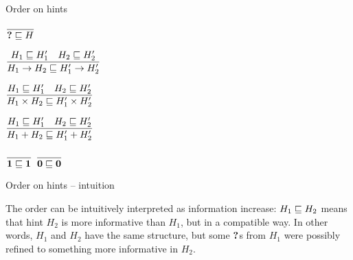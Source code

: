 \documentclass{beamer}
\newcommand{\Fun}[2]{#1 \to #2}
\newcommand{\Prod}[2]{#1 \times #2}
\newcommand{\Sum}[2]{#1 + #2}
\newcommand{\Unit}{\textbf{1}}
\newcommand{\Empty}{\textbf{0}}
\newcommand{\rulename}[1]{\textsc{\footnotesize{#1}}}
\newcommand{\infrule}[3][]{\displaystyle \frac{#2}{#3} \rulename{#1}}
\begin{document}
\begin{frame}{Order on hints}

\begin{center}
  $\infrule{}{\hintorder{\Hole}{H}}$

  \vspace{2em}

  $\infrule{\hintorder{H_1}{H_1'} \quad \hintorder{H_2}{H_2'}}{\hintorder{\Fun{H_1}{H_2}}{\Fun{H'_1}{H'_2}}}$

  \vspace{2em}

  $\infrule{\hintorder{H_1}{H_1'} \quad \hintorder{H_2}{H_2'}}{\hintorder{\Prod{H_1}{H_2}}{\Prod{H_1'}{H_2'}}}$

  \vspace{2em}

  $\infrule{\hintorder{H_1}{H_1'} \quad \hintorder{H_2}{H_2'}}{\hintorder{\Sum{H_1}{H_2}}{\Sum{H_1'}{H_2'}}}$

  \vspace{2em}

  $\infrule{}{\hintorder{\Unit}{\Unit}}$ \quad
  $\infrule{}{\hintorder{\Empty}{\Empty}}$
\end{center}

\end{frame}

\begin{frame}{Order on hints -- intuition}

The order can be intuitively interpreted as information increase: $H_1 \sqsubseteq H_2$ means that hint $H_2$ is more informative than $H_1$, but in a compatible way. In other words, $H_1$ and $H_2$ have the same structure, but some $\textbf{?}$s from $H_1$ were possibly refined to something more informative in $H_2$.

\end{frame}
\end{document}
